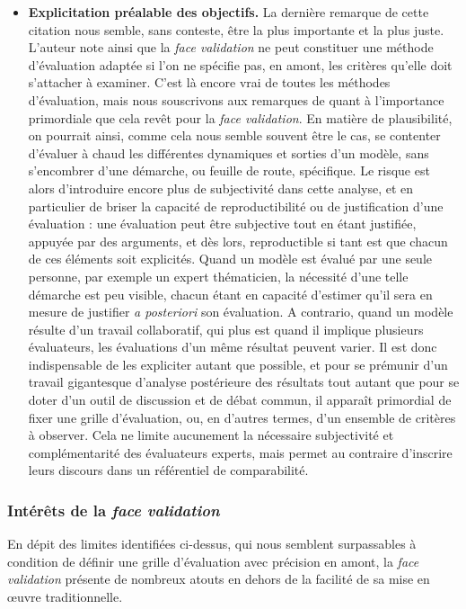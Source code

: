 \begin{itemize}
	\item \textbf{Explicitation préalable des objectifs.}
	La dernière remarque de cette citation nous semble, sans conteste, être la plus importante et la plus juste.
	L'auteur note ainsi que la \textit{face validation} ne peut constituer une méthode d'évaluation adaptée si l'on ne spécifie pas, en amont, les critères qu'elle doit s'attacher à examiner.
	C'est là encore vrai de toutes les méthodes d'évaluation, mais nous souscrivons aux remarques de \citeauthor{hermann_validation_1967} quant à l'importance primordiale que cela revêt pour la \textit{face validation}.
	En matière de plausibilité, on pourrait ainsi, comme cela nous semble souvent être le cas, se contenter d'évaluer \og à chaud\fg{} les différentes dynamiques et sorties d'un modèle, sans s'encombrer d'une démarche, ou feuille de route, spécifique.
	Le risque est alors d'introduire encore plus de subjectivité dans cette analyse, et en particulier de briser la capacité de reproductibilité ou de justification d'une évaluation :
	une évaluation peut être subjective tout en étant justifiée, appuyée par des arguments, et dès lors, reproductible si tant est que chacun de ces éléments soit explicités.
	Quand un modèle est évalué par une seule personne, par exemple un expert thématicien, la nécessité d'une telle démarche est peu visible, chacun étant en capacité d'estimer qu'il sera en mesure de justifier \textit{a posteriori} son évaluation.
	A contrario, quand un modèle résulte d'un travail collaboratif, qui plus est quand il implique plusieurs évaluateurs, les évaluations d'un même résultat peuvent varier.
	Il est donc indispensable de les expliciter autant que possible, et pour se prémunir d'un travail gigantesque d'analyse postérieure des résultats tout autant que pour se doter d'un outil de discussion et de débat commun, il apparaît primordial de fixer une grille d'évaluation, ou, en d'autres termes, d'un ensemble de critères à observer.
	Cela ne limite aucunement la nécessaire subjectivité et complémentarité des évaluateurs experts, mais permet au contraire d'inscrire leurs discours dans un référentiel de comparabilité.
	
\end{itemize}

\subsubsection{Intérêts de la \textit{face validation}}

En dépit des limites identifiées ci-dessus, qui nous semblent surpassables à condition de définir une grille d'évaluation avec précision en amont, la \textit{face validation} présente de nombreux atouts en dehors de la facilité de sa mise en œuvre traditionnelle.

